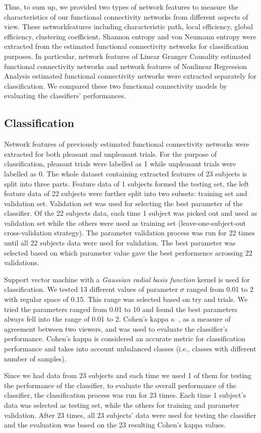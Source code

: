 Thus, to sum up, we provided two types of network features to measure the characteristics of our functional connectivity networks from different aspects of view. These networkfeatures including characteristic path, local efficiency, global efficiency, clustering coefficient, Shannon entropy and von Neumann entropy were extracted from the estimated functional connectivity networks for classification purposes. In particular, network features of Linear Granger Causality estimated functional connectivity networks and network features of Nonlinear Regression Analysis estimated functional connectivity networks were extracted separately for classification. We compared these two functional connectivity models by evaluating the classifiers' performances. 

\subsection{Classification}
Network features of previously estimated functional connectivity networks were extracted for both pleasant and unpleasant trials. For the purpose of classification, pleasant trials were labelled as 1 while unpleasant trials were labelled as 0. The whole dataset containing extracted features of 23 subjects is split into three parts. Feature data of 1 subjects formed the testing set, the left feature data of 22 subjects were further split into two subsets: training set and validation set. Validation set was used for selecting the best parameter of the classifier. Of the 22 subjects data, each time 1 subject was picked out and used as validation set while the others were used as training set (leave-one-subject-out cross-validation strategy). The parameter validation process was run for 22 times until all 22 subjects data were used for validation. The best parameter was selected based on which parameter value gave the best performence acrossing 22 validations.    

Support vector machine with a \emph{Gaussian radial basis function} kernel is used for classification. We tested 13 different values of parameter $\sigma$ ranged from 0.01 to 2 with regular space of 0.15. This range was selected based on try and trials. We tried the parameters ranged from 0.01 to 10 and found the best parameters always fell into the range of 0.01 to 2. Cohen's kappa $\kappa$~\cite{uebersax1987diversity}, as a measure of agreement between two viewers, and was used to evaluate the classifier's performance. Cohen's kappa is considered an accurate metric for classification performance and takes into account unbalanced classes (i.e., classes with different number of samples). 

Since we had data from 23 subjects and each time we used 1 of them for testing the performance of the classifier, to evaluate the overall performance of the classifier, the classification process was run for 23 times. Each time 1 subject's data was selected as testing set, while the others for training and parameter validation. After 23 times, all 23 subjects' data were used for testing the classifier and the evaluation was based on the 23 resulting Cohen's kappa values. 
